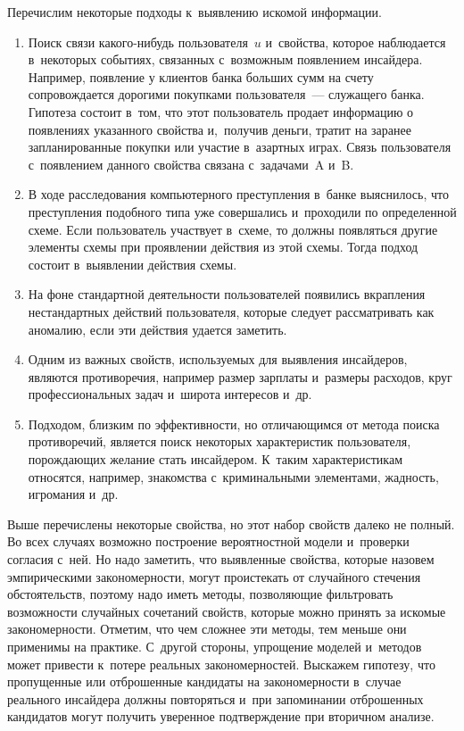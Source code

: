 \begin{multicols}{2}
  Перечислим некоторые подходы к~выявлению искомой информации.
  \begin{enumerate}[1.]
  \item Поиск связи ка\-ко\-го-ни\-будь пользователя~$u$ и~свойства, которое 
наблюдается в~некоторых событиях, связанных с~возможным появлением 
инсайдера. Например, появление у клиентов банка больших сумм на счету 
сопровождается дорогими покупками пользователя~--- служащего банка. 
Гипотеза состоит в~том, что этот пользователь продает информацию о 
появлениях указанного свойства и,~получив деньги, тратит на заранее 
запланированные покупки или участие в~азартных играх. Связь пользователя 
с~появлением данного свойства связана с~задачами~A и~B.
\item В ходе расследования компьютерного преступления в~банке 
выяснилось, что преступления подобного типа уже совершались 
и~проходили по определенной схеме. Если пользователь участвует в~схеме, 
то должны появляться другие элементы схемы при проявлении действия 
из этой схемы. Тогда подход состоит в~выявлении действия схемы.
\item На фоне стандартной деятельности пользователей появились 
вкрапления нестандартных действий пользователя, которые следует 
рас\-смат\-ри\-вать как аномалию, если эти действия удается заметить.
\item Одним из важных свойств, используемых для выявления инсайдеров, 
являются противоречия, например размер зарплаты и~размеры расходов, 
круг профессиональных задач и~широта интересов и~др.
\item Подходом, близким по эффективности, но отличающимся от метода 
поиска противоречий, является поиск некоторых характеристик 
пользователя, порождающих желание стать инсайдером. К~таким 
характеристикам относятся, например, знакомства с~криминальными 
элементами, жадность, игромания и~др.
\end{enumerate}

  Выше перечислены некоторые свойства, но этот набор свойств далеко не 
полный. Во всех случаях возможно построение вероятностной модели 
и~проверки согласия с~ней. Но надо заметить, что выявленные свойства, которые 
назовем эмпирическими закономерности, могут проистекать от случайного 
стечения обстоятельств, поэтому надо иметь методы, позволяющие фильтровать 
возможности случайных сочетаний свойств, которые можно принять за 
искомые закономерности. Отметим, что чем сложнее эти методы, тем меньше 
они применимы на практике. С~другой стороны, упрощение моделей и~методов 
может привести к~потере реальных закономерностей. Выскажем гипотезу, что 
пропущенные или отброшенные кандидаты на закономерности в~случае 
реального инсайдера должны повторяться и~при запоминании отброшенных 
кандидатов могут получить уверенное подтверждение при вторичном анализе. 
  

\end{multicols}
